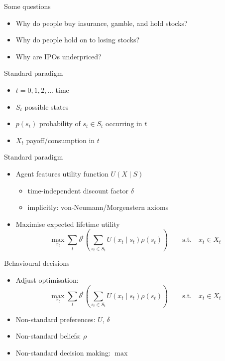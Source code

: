 \documentclass[11pt, aspectratio=169]{beamer}
\begin{document}
\begin{frame}{Some questions}
    \begin{itemize}
        \item Why do people buy insurance, gamble, and hold stocks?\bigskip
        \item Why do people hold on to losing stocks?\bigskip
        \item Why are IPOs underpriced?\bigskip
    \end{itemize}
\end{frame}

\begin{frame}{Standard paradigm}
    \begin{itemize}
        \item $t= 0,1,2,...$ time\bigskip
        \item $S_t$ possible states\bigskip
        \item $p(s_t)$ probability of $s_t \in S_t$ occurring in $t$\bigskip
        \item $X_t$ payoff/consumption in $t$\bigskip
    \end{itemize}
\end{frame}

\begin{frame}{Standard paradigm}
\begin{itemize}
    \item Agent features utility function $U(X\mid S)$\medskip
    \begin{itemize}
\item time-independent discount factor $\delta $\medskip
\item implicitly: von-Neumann/Morgenstern axioms\medskip
\end{itemize}\bigskip

    \item Maximise expected lifetime utility\medskip
	\[\max_{x_t} \sum_t  \delta^t \left(\sum_{s_t \in S_t} U(x_t \mid s_t)\rho (s_t) \right) \qquad \text{s.t.} \quad x_t \in X_t\]
   \end{itemize}
\end{frame}


\begin{frame}{Behavioural decisions}
\begin{itemize}
\item Adjust optimisation:
	\[\max_{x_t} \sum_t  \delta^t \left(\sum_{s_t \in S_t} U(x_t \mid s_t)\rho (s_t) \right) \qquad \text{s.t.} \quad x_t \in X_t\]\bigskip
        \item Non-standard preferences: $U$, $\delta $\bigskip
        \item Non-standard beliefs: $\rho$\bigskip
        \item Non-standard decision making: $\max$\bigskip
\end{itemize}
\end{frame}
\end{document}
